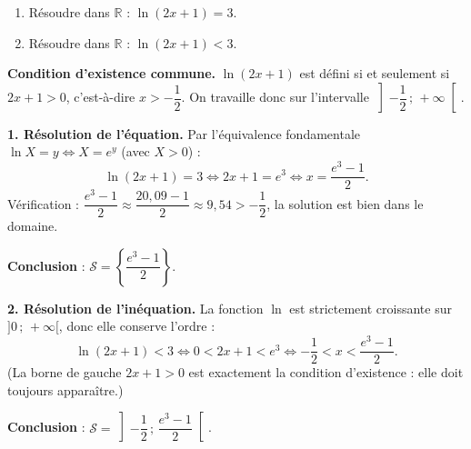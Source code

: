 \documentclass[11pt]{article}
\begin{document}
\begin{exoresolu}
\begin{enumerate}
\item Résoudre dans $\mathbb{R}$ : $\ln(2x + 1) = 3$.
\item Résoudre dans $\mathbb{R}$ : $\ln(2x + 1) < 3$.
\end{enumerate}
\tcblower
\textbf{Condition d'existence commune.} $\ln(2x+1)$ est défini si et seulement si $2x + 1 > 0$, c'est-à-dire $x > -\dfrac{1}{2}$. On travaille donc sur l'intervalle $\left]-\dfrac{1}{2}\,;\, +\infty\right[$.

\textbf{1. Résolution de l'équation.} Par l'équivalence fondamentale $\ln X = y \iff X = e^y$ (avec $X > 0$) :
\[ \ln(2x + 1) = 3 \iff 2x + 1 = e^3 \iff x = \dfrac{e^3 - 1}{2}. \]
Vérification : $\dfrac{e^3 - 1}{2} \approx \dfrac{20,09 - 1}{2} \approx 9,54 > -\dfrac{1}{2}$, la solution est bien dans le domaine.

\textbf{Conclusion} : $\mathcal{S} = \left\{ \dfrac{e^3 - 1}{2} \right\}$.

\textbf{2. Résolution de l'inéquation.} La fonction $\ln$ est strictement croissante sur $]0\,;\,+\infty[$, donc elle conserve l'ordre :
\[ \ln(2x+1) < 3 \iff 0 < 2x + 1 < e^3 \iff -\dfrac{1}{2} < x < \dfrac{e^3 - 1}{2}. \]
(La borne de gauche $2x+1 > 0$ est exactement la condition d'existence : elle doit toujours apparaître.)

\textbf{Conclusion} : $\mathcal{S} = \left] -\dfrac{1}{2} \,;\, \dfrac{e^3 - 1}{2} \right[$.
\end{exoresolu}
\end{document}
